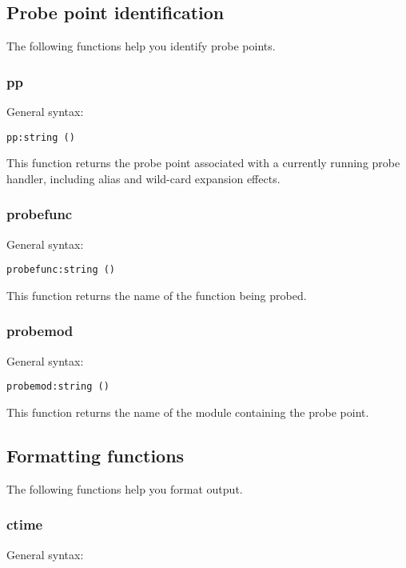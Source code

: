 \documentclass[twoside,english]{article}
\newenvironment{vindent}
{\begin{list}{}{\setlength{\listparindent}{6pt}}
\item[]}
{\end{list}}
\begin{document}
\subsection{Probe point identification}

The following functions help you identify probe points.


\subsubsection{pp}
General syntax:

\begin{vindent}
\begin{verbatim}
pp:string ()
\end{verbatim}
\end{vindent}
This function returns the probe point associated with a currently running
probe handler, including alias and wild-card expansion effects.


\subsubsection{probefunc}
General syntax:

\begin{vindent}
\begin{verbatim}
probefunc:string ()
\end{verbatim}
\end{vindent}
This function returns the name of the function being probed.


\subsubsection{probemod}
General syntax:

\begin{vindent}
\begin{verbatim}
probemod:string ()
\end{verbatim}
\end{vindent}
This function returns the name of the module containing the probe point.


\subsection{Formatting functions}
The following functions help you format output.


\subsubsection{ctime}
General syntax:
\end{document}
